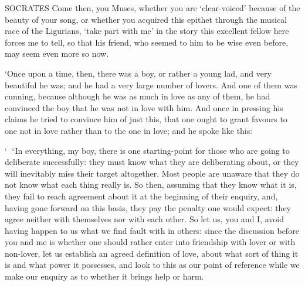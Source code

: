 SOCRATES Come then, you Muses, whether you are ‘clear-voiced' because of
the beauty of your song, or whether you acquired this epithet through
the musical race of the
Ligurians, 
‘take part with me' in
the story this excellent fellow here forces me to tell, so that his
friend, who seemed to him
to be  wise even before, may seem even more so now.

‘Once upon a time, then, there was a boy, or rather a young lad, and
very beautiful he was; and he had a very large number of lovers. And one
of them was cunning, because although he was as much in love as any of
them, he had convinced the boy that he was not in love with him. And
once in pressing his  claims he tried to convince him of just
this, that one ought to grant favours to one not in love rather than to
the one in love; and he spoke like this:

‘~“In everything, my boy, there is one starting-point for those who are
going to deliberate successfully: they must know what  they are
deliberating about, or they will inevitably miss their target
altogether. Most people are unaware that they do not know what each
thing really is. So then,
assuming that they know what it is, they fail to reach agreement about
it at the beginning of their enquiry, and, having gone forward on this
basis, they pay the penalty one would expect: they agree neither
 with themselves nor with each other. So let us, you and I,
avoid having happen to us what we find fault with in others: since the
discussion before you and me is whether one should rather enter into
friendship with lover or with non-lover, let us establish an agreed
definition of love, about what sort of thing it is  and what
power it possesses, and look to this as our point of reference while we
make our enquiry as to whether it brings help or harm.

